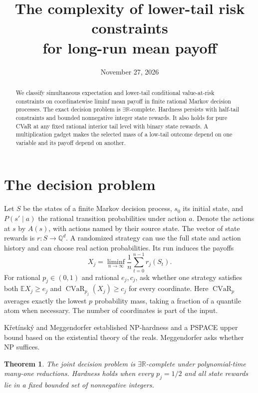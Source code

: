 \documentclass[11pt,a4paper]{amsart}
\title[Lower-tail risk constraints for long-run mean payoff]{The complexity of lower-tail risk constraints\texorpdfstring{\\}{ }for long-run mean payoff}
\date{November 27, 2026}
\newtheorem{theorem}{Theorem}
\newcommand{\RR}{\exists\mathbb R}
\newcommand{\CV}{\operatorname{CVaR}}
\begin{document}
\begin{abstract}
We classify simultaneous expectation and lower-tail conditional value-at-risk constraints on coordinatewise liminf mean payoff in finite rational Markov decision processes. The exact decision problem is \(\RR\)-complete. Hardness persists with half-tail constraints and bounded nonnegative integer state rewards. It also holds for pure CVaR at any fixed rational interior tail level with binary state rewards. A multiplication gadget makes the selected mass of a low-tail outcome depend on one variable and its payoff depend on another.
\end{abstract}
\maketitle

\section{The decision problem}

Let \(S\) be the states of a finite Markov decision process, \(s_0\) its initial state, and \(P(s'\mid a)\) the rational transition probabilities under action \(a\). Denote the actions at \(s\) by \(A(s)\), with actions named by their source state. The vector of state rewards is \(r:S\to\mathbb Q^d\). A randomized strategy can use the full state and action history and can choose real action probabilities. Its run induces the payoffs
\[
 X_j=\liminf_{n\to\infty}\frac1n\sum_{t=0}^{n-1}r_j(S_t).
\]
For rational \(p_j\in(0,1)\) and rational \(e_j,c_j\), ask whether one strategy satisfies both \(\mathbb E X_j\ge e_j\) and \(\CV_{p_j}(X_j)\ge c_j\) for every coordinate. Here \(\CV_p\) averages exactly the lowest \(p\) probability mass, taking a fraction of a quantile atom when necessary. The number of coordinates is part of the input.

K\v{r}et\'insk\'y and Meggendorfer \cite[Definition~3.2 and \S6.3]{km} established NP-hardness and a PSPACE upper bound based on the existential theory of the reals. Meggendorfer \cite[\S6.2]{thesis} asks whether NP suffices.

\begin{theorem}\label{thm:base}
The joint decision problem is \(\RR\)-complete under polynomial-time many-one reductions. Hardness holds when every \(p_j=1/2\) and all state rewards lie in a fixed bounded set of nonnegative integers.
\end{theorem}
\end{document}
